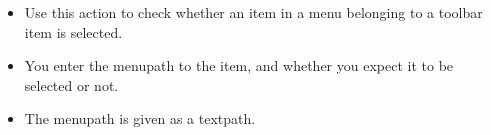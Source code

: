 
\begin{itemize}
\item Use this action to check whether an item in a menu belonging to a toolbar item is selected.
\item You enter the menupath to the item, and whether you expect it to be selected or not.
\item The menupath is given as a textpath. 
\end{itemize}
